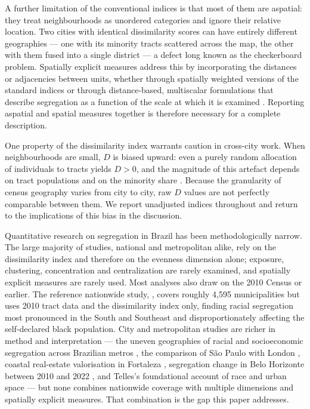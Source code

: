 \documentclass[pdflatex,sn-basic]{sn-jnl}%
\begin{document}
A further limitation of the conventional indices is that most of them are aspatial: they treat neighbourhoods as unordered categories and ignore their relative location. Two cities with identical dissimilarity scores can have entirely different geographies --- one with its minority tracts scattered across the map, the other with them fused into a single district --- a defect long known as the checkerboard problem. Spatially explicit measures address this by incorporating the distances or adjacencies between units, whether through spatially weighted versions of the standard indices \citep{wong1993spatial, morgan1983distance} or through distance-based, multiscalar formulations that describe segregation as a function of the scale at which it is examined \citep{reardon2002measures}. Reporting aspatial and spatial measures together is therefore necessary for a complete description.

One property of the dissimilarity index warrants caution in cross-city work. When neighbourhoods are small, $D$ is biased upward: even a purely random allocation of individuals to tracts yields $D > 0$, and the magnitude of this artefact depends on tract populations and on the minority share \citep{cortese1976further, carrington1997measuring, allen2015more}. Because the granularity of census geography varies from city to city, raw $D$ values are not perfectly comparable between them. We report unadjusted indices throughout and return to the implications of this bias in the discussion.

Quantitative research on segregation in Brazil has been methodologically narrow. The large majority of studies, national and metropolitan alike, rely on the dissimilarity index and therefore on the evenness dimension alone; exposure, clustering, concentration and centralization are rarely examined, and spatially explicit measures are rarely used. Most analyses also draw on the 2010 Census or earlier. The reference nationwide study, \citet{deSouza2023nationwide_english}, covers roughly 4{,}595 municipalities but uses 2010 tract data and the dissimilarity index only, finding racial segregation most pronounced in the South and Southeast and disproportionately affecting the self-declared black population. City and metropolitan studies are richer in method and interpretation --- the uneven geographies of racial and socioeconomic segregation across Brazilian metros \citep{barros2018unevengeographies}, the comparison of S\~ao Paulo with London \citep{barros2024saopaulolondres}, coastal real-estate valorisation in Fortaleza \citep{danilofranca2022fortaleza}, segregation change in Belo Horizonte between 2010 and 2022 \citep{strauch2026bh20102022}, and Telles's foundational account of race and urban space \citep{telles2004race} --- but none combines nationwide coverage with multiple dimensions and spatially explicit measures. That combination is the gap this paper addresses.
\end{document}
